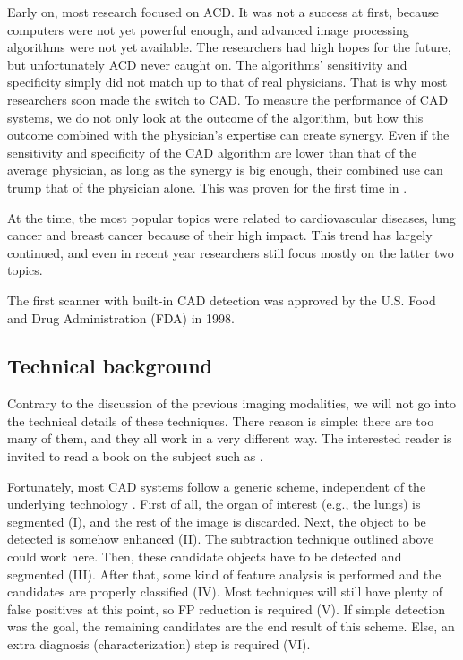 Early on, most research focused on ACD. It was not a success at first,
because computers were not yet powerful enough, and advanced image processing
algorithms were not yet available. The researchers had high hopes for the
future, but unfortunately ACD never caught on. The algorithms' sensitivity and
specificity simply did not match up to that of real physicians. That is why most
researchers soon made the switch to CAD. To measure the performance of CAD
systems, we do not only look at the outcome of the algorithm, but how this outcome
combined with the physician's expertise can create synergy. Even if the
sensitivity and specificity of the CAD algorithm are lower than that of the
average physician, as long as the synergy is big enough, their combined use can
trump that of the physician alone. This was proven for the first time in
\cite{cadsynergy}.

At the time, the most popular topics were related to cardiovascular diseases,
lung cancer and breast cancer because of their high impact. This trend has
largely continued, and even in recent year researchers still focus mostly on the
latter two topics. \cite{cadhistory}

The first scanner with built-in CAD detection was approved by the U.S. Food and
Drug Administration (FDA) in 1998.

\subsection{Technical background}\label{ssec:cadtech}
Contrary to the discussion of the previous imaging modalities, we will not go
into the technical details of these techniques. There reason is simple: there
are too many of them, and they all work in a very different way. The interested
reader is invited to read a book on the subject such as \cite{imgprocbook}.

Fortunately, most CAD systems follow a generic scheme, independent of the
underlying technology \cite{lungcadreview}. First of all, the organ of interest
(e.g., the lungs) is segmented (I), and the rest of the image is discarded.
Next, the object to be detected is somehow enhanced (II). The subtraction
technique outlined above could work here. Then, these candidate objects have to
be detected and segmented (III). After that, some kind of feature analysis is
performed and the candidates are properly classified (IV). Most techniques will
still have plenty of false positives at this point, so FP reduction is required
(V). If simple detection was the goal, the remaining candidates are the end
result of this scheme. Else, an extra diagnosis (characterization) step is
required (VI).

